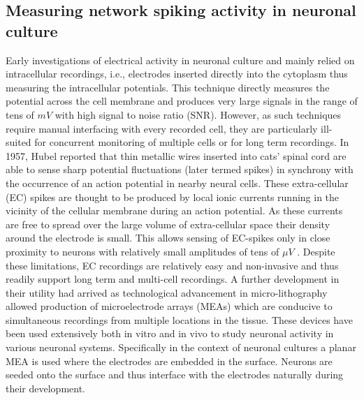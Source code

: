     \subsection{Measuring network spiking activity in neuronal culture}
    Early investigations of electrical activity in neuronal culture and mainly relied on intracellular recordings, i.e., electrodes inserted directly into the cytoplasm thus measuring the intracellular potentials. This technique directly measures the potential across the cell membrane and produces very large signals in the range of tens of \(mV\) with high signal to noise ratio (SNR). However, as such techniques require manual interfacing with every recorded cell, they are particularly ill-suited for concurrent monitoring of multiple cells or for long term recordings. In 1957, Hubel \cite{hubel1957tungsten} reported that thin metallic wires inserted into cats' spinal cord are able to sense sharp potential fluctuations (later termed spikes) in synchrony with the occurrence of an action potential in nearby neural cells. These extra-cellular (EC) spikes are thought to be produced by local ionic currents running in the vicinity of the cellular membrane during an action potential. As these currents are free to spread over the large volume of extra-cellular space their density around the electrode is small. This allows sensing of EC-spikes only in close proximity to neurons with relatively small amplitudes of tens of $\mu V$ \cite{herzog2011optical}. Despite these limitations, EC recordings are relatively easy and non-invasive and thus readily support long term and multi-cell recordings. A further development in their utility had arrived as technological advancement in micro-lithography allowed production of microelectrode arrays (MEAs)\cite{Morin2005,Buzsaki2004} which are conducive to simultaneous recordings from multiple locations in the tissue. These devices have been used extensively both in vitro and in vivo to study neuronal activity in various neuronal systems. Specifically in the context of neuronal cultures a planar MEA is used where the electrodes are embedded in the surface. Neurons are seeded onto the surface and thus interface with the electrodes naturally during their development\cite{PotterRev2001,Morin2005,Marom02}.

